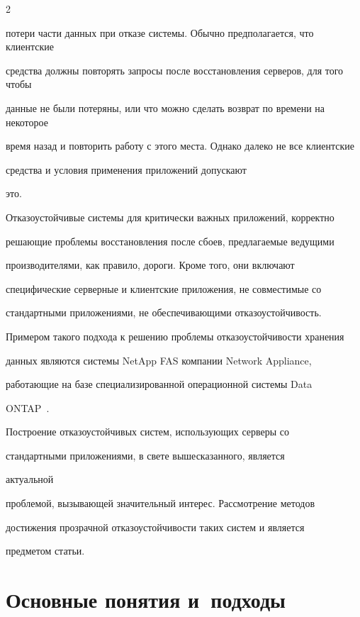 \begin{multicols}{2}
{потери части данных при отказе системы. Обычно предполагается, что клиентские 

средства должны повторять запросы после восстановления серверов, для того чтобы 

данные не были потеряны, или что можно сделать возврат по времени на некоторое 

время назад и повторить работу с этого места. Однако далеко не все клиентские 

средства и условия применения приложений допускают\linebreak

 это.



Отказоустойчивые системы для критически важных приложений, корректно

решающие проблемы восстановления после сбоев,   пред\-лагаемые ведущими

производителями, как правило, дороги. Кроме того, они включают

специфические серверные и клиентские приложения, не совместимые со

стандартными приложениями, не обеспечивающими отказоустойчивость.

Примером такого подхода к решению проблемы отказоустойчивости  хранения

данных являются системы NetApp FAS компании Network Appliance,

работающие на базе специализированной операционной системы Data

ONTAP~\cite{1zak}.



Построение отказоустойчивых систем, использующих серверы со

стандартными приложениями, в свете вышесказанного, является

 актуальной

проблемой, вызывающей значительный интерес. Рассмотрение методов

до\-сти\-же\-ния прозрачной отказоустойчивости таких сис\-тем и является

предметом статьи.



}



\section{Основные понятия и~подходы}

{\nwt



}
\end{multicols}
